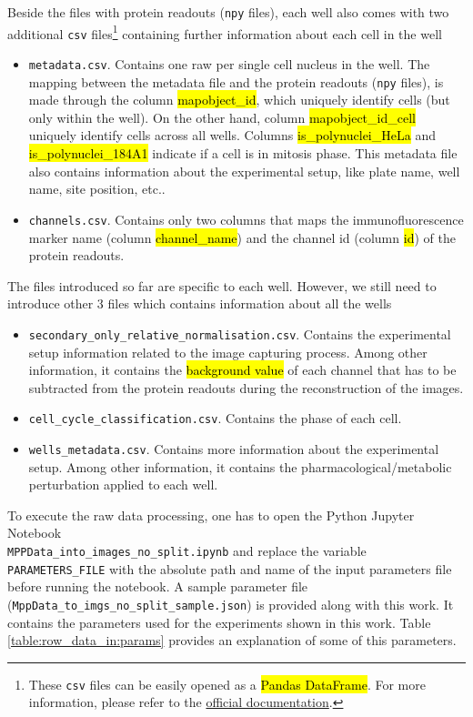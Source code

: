 Beside the files with protein readouts (\texttt{npy} files), each well also comes with two additional \texttt{csv} files\footnote{These \texttt{csv} files can be easily opened as a \hl{Pandas DataFrame}. For more information, please refer to the \href{https://pandas.pydata.org/pandas-docs/stable/reference/api/pandas.DataFrame.html}{official documentation}.} containing further information about each cell in the well

\begin{itemize}
  \item \texttt{metadata.csv}. Contains one raw per single cell nucleus in the well. The mapping between the metadata file and the protein readouts (\texttt{npy} files), is made through the column \hl{mapobject\_id}, which uniquely identify cells (but only within the well). On the other hand, column \hl{mapobject\_id\_cell} uniquely identify cells across all wells. Columns \hl{is\_polynuclei\_HeLa} and	\hl{is\_polynuclei\_184A1} indicate if a cell is in mitosis phase. This metadata file also contains information about the experimental setup, like plate name, well name, site position, etc..
  \item \texttt{channels.csv}. Contains only two columns that maps the immunofluorescence marker name (column \hl{channel\_name}) and the channel id (column \hl{id}) of the protein readouts.
\end{itemize}

The files introduced so far are specific to each well. However, we still need to introduce other 3 files which contains information about all the wells

\begin{itemize}
  \item \texttt{secondary\_only\_relative\_normalisation.csv}. Contains the experimental setup information related to the image capturing process. Among other information, it contains the \hl{background value} of each channel that has to be subtracted from the protein readouts during the reconstruction of the images.
  \item \texttt{cell\_cycle\_classification.csv}. Contains the phase of each cell.
  \item \texttt{wells\_metadata.csv}. Contains more information about the experimental setup. Among other information, it contains the pharmacological/metabolic perturbation applied to each well.
\end{itemize}

To execute the raw data processing, one has to open the Python Jupyter Notebook \\
\noindent\texttt{MPPData\_into\_images\_no\_split.ipynb} and replace the variable \texttt{PARAMETERS\_FILE} with the absolute path and name of the input parameters file before running the notebook. A sample parameter file (\texttt{MppData\_to\_imgs\_no\_split\_sample.json}) is provided along with this work. It contains the parameters used for the experiments shown in this work. Table \ref{table:row_data_in:params} provides an explanation of some of this parameters.

